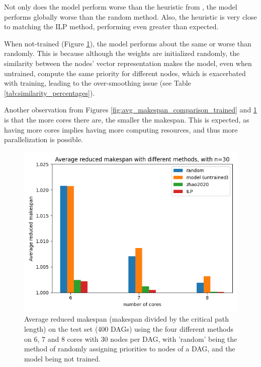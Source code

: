 Not only does the model perform worse than the heuristic from \citet{zhao2020DAGsched},
the model performs globally worse than the random method.
Also, the heuristic is very close to matching the ILP method,
performing even greater than expected.

When not-trained (Figure \ref{fig:avg_makespan_comparison_untrained}), the model performs 
about the same or worse than randomly.
This is because although the weights are initialized randomly,
the similarity between the nodes' vector representation
makes the model, even when untrained, 
compute the same priority for different nodes, which 
is exacerbated with training, leading to the over-smoothing
issue (see Table \ref{tab:similarity_percentages}).

Another observation from Figures \ref{fig:avg_makespan_comparison_trained}
and \ref{fig:avg_makespan_comparison_untrained} is that 
the more cores there are, the smaller the makespan.
This is expected, as having more cores implies having more 
computing resources, and thus more parallelization is possible.

\begin{figure}
    \centering
    \includegraphics[width=\linewidth]{images/avg_makespan_n30_untrained.png}
    \caption{Average reduced makespan (makespan divided by the critical path length) on the test set (400 DAGs) using the four different methods
    on 6, 7 and 8 cores with 30 nodes per DAG,
    with 'random' being the method of randomly assigning priorities to nodes of a DAG,
    and the model being not trained.}
    \label{fig:avg_makespan_comparison_untrained}
\end{figure}


